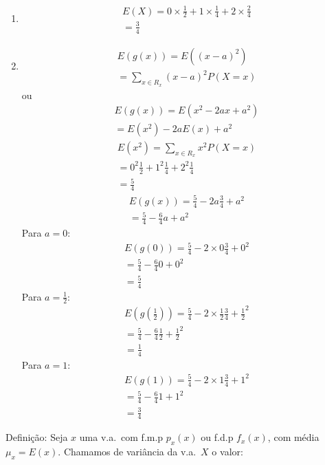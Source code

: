 \documentclass[11pt,a4paper]{book}
\begin{document}
\begin{enumerate}[label=(\alph*)]
\begin{enumerate}
\begin{enumerate}[label=(\alph*)]
  \item 
    \begin{align}
      E(X)=0 \times \frac{1}{2}+ 1 \times \frac{1}{4}+ 2 \times \frac{2}{4}\\
      =\frac{3}{4}
    \end{align}
  \item 
    \begin{align}
      E(g(x))=E({(x-a)}^2)\\
      =\sum_{x \in R_{x}}(x-a)^2P(X=x)
    \end{align}
    ou
    \begin{align}
      E(g(x))=E(x^2-2ax+a^2)\\
      =E(x^2)-2aE(x)+a^2
    \end{align}
    \begin{align}
      E(x^2)=\sum_{x \in R_{x}} x^2 P(X=x)\\
      =0^2 \frac{1}{2}+1^2 \frac{1}{4}+ 2^2 \frac{1}{4}\\
      =\frac{5}{4}
    \end{align}
    \begin{align}
      E(g(x))=\frac{5}{4}-2a \frac{3}{4}+a^2\\
      =\frac{5}{4}-\frac{6}{4}a+a^{2}
    \end{align}
    Para $a=0$:
    \begin{align}
      E(g(0))=\frac{5}{4}-2\times 0 \frac{3}{4}+0^2\\
      =\frac{5}{4}-\frac{6}{4}0+0^{2}\\
      =\frac{5}{4}
    \end{align}
    Para $a=\frac{1}{2}$:
    \begin{align}
      E(g(\frac{1}{2}))=\frac{5}{4}-2\times \frac{1}{2} \frac{3}{4}+\frac{1}{2}^2\\
      =\frac{5}{4}-\frac{6}{4}\frac{1}{2}+\frac{1}{2}^{2}\\
      =\frac{1}{4}
    \end{align}
    Para $a=1$:
    \begin{align}
      E(g(1))=\frac{5}{4}-2\times 1 \frac{3}{4}+1^2\\
      =\frac{5}{4}-\frac{6}{4}1+1^{2}\\
      =\frac{3}{4}
    \end{align}
\end{enumerate}
Definição: Seja $x$ uma v.a.\ com f.m.p $p_{x}(x)$ ou f.d.p $f_{x}(x)$, com 
média $\mu_{x}=E(x)$. Chamamos de variância da v.a.\ $X$ o valor: 

\end{enumerate}
\end{enumerate}
\end{document}

